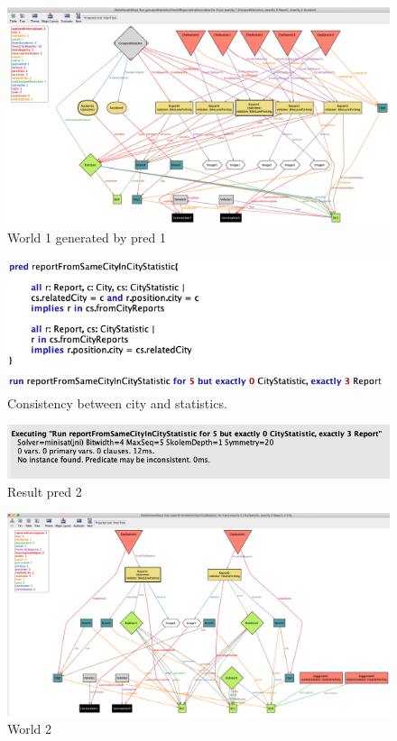 \begin{figure}
	\centering
	\includegraphics[width=0.9\linewidth, height=0.5\textheight]{Images/Alloy/world1}
	\caption{World 1 generated by pred 1}
	\label{World1 }
\end{figure}
\newpage
\begin{figure}
	\centering
	\includegraphics[width=0.9\linewidth, height=0.15\textheight]{Images/Alloy/test-world21}
	\caption{Consistency between city and statistics.}
	\label{Pred 2}
\end{figure}

\begin{figure}
	\centering
	\includegraphics[width=0.9\linewidth, height=0.11\textheight]{Images/Alloy/test-world22}
	\caption{Result pred 2}
	\label{Result pred 2}
\end{figure}

\begin{figure}
	\centering
	\includegraphics[width=1\linewidth, height=0.47\textheight]{Images/Alloy/world2}
	\caption{World 2}
	\label{World2}
\end{figure}

